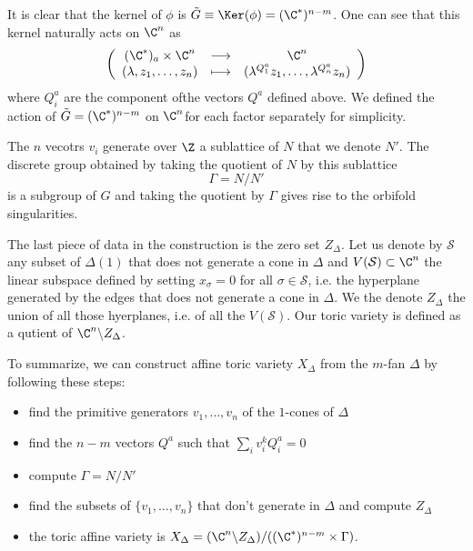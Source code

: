\documentclass{worksheetclass}
\begin{document}
        It is clear that the kernel of $\phi$ is $\tilde{G}\equiv\Ker(\phi)=(\C^*)^{n-m}$.  One can see that this kernel naturally acts on $\C^n$ as
        \begin{equation}
            \left(
            \begin{array}{ccc}
                (\C^*)_a\times\C^n & \longrightarrow & \C^n \\
                (\lambda,z_1,\dots,z_n) & \longmapsto & (\lambda^{Q^a_1} z_1,\dots,\lambda^{Q^a_n} z_n)
            \end{array}
            \right)
        \end{equation}
        where $Q^a_i$ are the component ofthe vectors $Q^a$ defined above. We defined the action of $\tilde{G}=(\C^*)^{n-m}$ on $\C^n$for each factor separately for simplicity.

        The $n$ vecotrs $v_i$ generate over $\Z$ a sublattice of $N$ that we denote $N'$. The discrete group obtained by taking the quotient of $N$ by this sublattice
        \begin{equation}
            \Gamma=N/N'
        \end{equation}
        is a subgroup of $G$ and taking the quotient by $\Gamma$ gives rise to the orbifold singularities.

        The last piece of data in the construction is the zero set $Z_\Delta$. Let us denote by $\mathcal{S}$ any subset of $\Delta(1)$ that does not generate a cone in $\Delta$ and $V(\mathcal{S})\subset\C^n$ the linear subspace defined by setting $x_\sigma=0$ for all $\sigma\in\mathcal{S}$, i.e. the hyperplane generated by the edges that does not generate a cone in $\Delta$. We the denote $Z_\Delta$ the union of all those hyerplanes, i.e. of all the $V(\mathcal{S})$. Our toric variety is defined as a qutient of $\C^n\backslash Z_\Delta$.

        To summarize, we can construct affine toric variety $X_\Delta$ from the $m$-fan $\Delta$ by following these steps:
        \begin{itemize}
            \item find the primitive generators $v_1,\dots,v_n$ of the $1$-cones of $\Delta$
            \item find the $n-m$ vectors $Q^a$ such that $\sum_iv^k_i Q^a_i=0$
            \item compute $\Gamma=N/N'$
            \item find the subsets of $\{v_1,\dots,v_n\}$ that don't generate in $\Delta$ and compute $Z_\Delta$
            \item the toric affine variety is $X_\Delta=(\C^n\backslash Z_\Delta)/((\C^*)^{n-m}\times\Gamma)$.
        \end{itemize}
\end{document}
